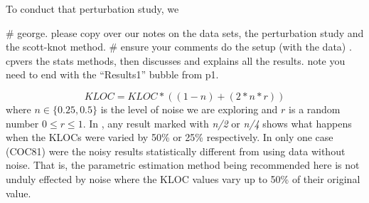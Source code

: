 
   To conduct that perturbation study, we 
   

   # george. please copy over our notes on the data sets, the perturbation study and the scott-knot method.
   # ensure your comments do the setup (with the data) . cpvers the stats methods, then discusses and explains all the results. note you need to end with the ``Results1'' bubble from p1.

     
\[\mathit{KLOC} = \mathit{KLOC}*((1- n) + (2*n*r))\]
where $n \in \{0.25,0.5\}$ is the level of noise we are exploring and $r$ is a random number
$0 \le r \le 1$. In , any result
marked with {\em n/2} or {\em n/4} shows what happens
when the KLOCs were varied by 50\% or 25\% respectively.
In only one case (COC81) were the noisy results statistically
different from using data without noise. That is,
the parametric estimation method being recommended here is
not unduly effected by noise where the KLOC values
vary up to 50\% of their original value.
